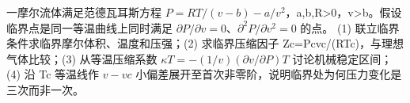 一摩尔流体满足范德瓦耳斯方程 \(P=RT/(v-b)-a/v^{2}\)，a,b,R>0，v>b。假设临界点是同一等温曲线上同时满足 \(\partial P/\partial v=0\)、\(\partial ^{2}P/\partial v^{2}=0\) 的点。
(1) 联立临界条件求临界摩尔体积、温度和压强；(2) 求临界压缩因子 Zc=Pcvc/(RTc)，与理想气体比较；(3) 从等温压缩系数 \(\kappa T=-(1/v)(\partial v/\partial P)T\) 讨论机械稳定区间；(4) 沿 Tc 等温线作 \(v-vc\) 小偏差展开至首次非零阶，说明临界处为何压力变化是三次而非一次。
